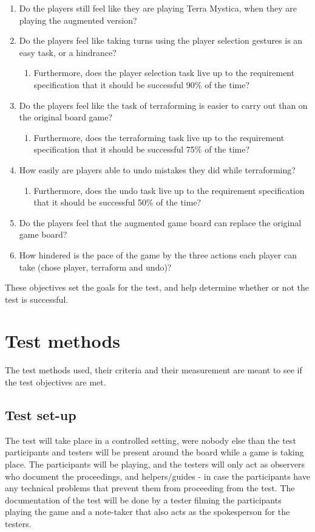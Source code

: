 \begin{enumerate}
\item Do the players still feel like they are playing Terra Mystica, when they are playing the augmented version?
\item Do the players feel like taking turns using the player selection gestures is an easy task, or a hindrance?
\begin{enumerate}
\item Furthermore, does the player selection task live up to the requirement specification that it should be successful 90\% of the time?
\end{enumerate}
\item Do the players feel like the task of terraforming is easier to carry out than on the original board game?
\begin{enumerate}
\item Furthermore, does the terraforming task live up to the requirement specification that it should be successful 75\% of the time?
\end{enumerate}
\item How easily are players able to undo mistakes they did while terraforming?
\begin{enumerate}
\item Furthermore, does the undo task live up to the requirement specification that it should be successful 50\% of the time?
\end{enumerate}
\item Do the players feel that the augmented game board can replace the original game board?
\item How hindered is the pace of the game by the three actions each player can take (chose player, terraform and undo)?
\end{enumerate}

These objectives set the goals for the test, and help determine whether or not the test is successful. 

\section{Test methods}
The test methods used, their criteria and their measurement are meant to see if the test objectives are met.

\subsection{Test set-up}
The test will take place in a controlled setting, were nobody else than the test participants and testers will be present around the board while a game is taking place. The participants will be playing, and the testers will only act as observers who document the proceedings, and helpers/guides - in case the participants have any technical problems that prevent them from proceeding from the test.
The documentation of the test will be done by a tester filming the participants playing the game and a note-taker that also acts as the spokesperson for the testers.

